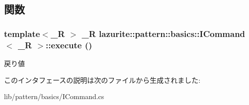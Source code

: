 \subsection{関数}
\hypertarget{interfacelazurite_1_1pattern_1_1basics_1_1_i_command_3_01___r_01_4_a6017a1753bb8c377fd8157353ac86c3d}{
\subsubsection[{execute}]{\setlength{\rightskip}{0pt plus 5cm}template$<$\_\-R $>$ \_\-R {\bf lazurite::pattern::basics::ICommand}$<$ \_\-R $>$::execute ()}}
\label{interfacelazurite_1_1pattern_1_1basics_1_1_i_command_3_01___r_01_4_a6017a1753bb8c377fd8157353ac86c3d}
\begin{DoxyReturn}{戻り値}

\end{DoxyReturn}


このインタフェースの説明は次のファイルから生成されました:\begin{DoxyCompactItemize}
\item 
lib/pattern/basics/ICommand.cs\end{DoxyCompactItemize}
